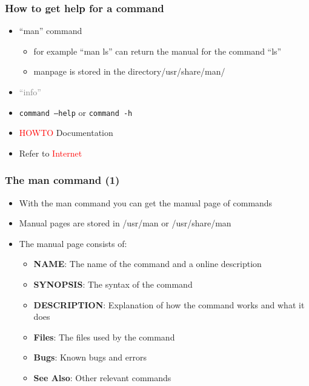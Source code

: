\documentclass[red]{beamer}
\begin{document}
\begin{CJK*}{UTF8}{gbsn}
\begin{frame}
\frametitle{How to get help for a command}
\begin{itemize}
    \item ``man'' command
    \begin{itemize}
        \item for example ``man ls'' can return the manual for the command ``ls''
        \item manpage is stored in the directory/usr/share/man/
    \end{itemize}
    \item \textcolor{gray}{``info''}
    \item \texttt{command --help} or \texttt{command -h}
    \item \textcolor{red}{HOWTO} Documentation
    \item Refer to \textcolor{red}{Internet}
\end{itemize}
\end{frame}

\begin{frame}
\frametitle{The man command (1)}
\begin{itemize}
    \item With the man command you can get the manual page of commands
    \item Manual pages are stored in /usr/man or /usr/share/man
    \item The manual page consists of:
    \begin{itemize}
        \item \textbf{NAME}: The name of the command and a online description
        \item \textbf{SYNOPSIS}: The syntax of the command
        \item \textbf{DESCRIPTION}: Explanation of how the command works and what it does
        \item \textbf{Files}: The files used by the command
        \item \textbf{Bugs}: Known bugs and errors
        \item \textbf{See Also}: Other relevant commands
    \end{itemize}
\end{itemize}
\end{frame}


\end{CJK*}
\end{document}
